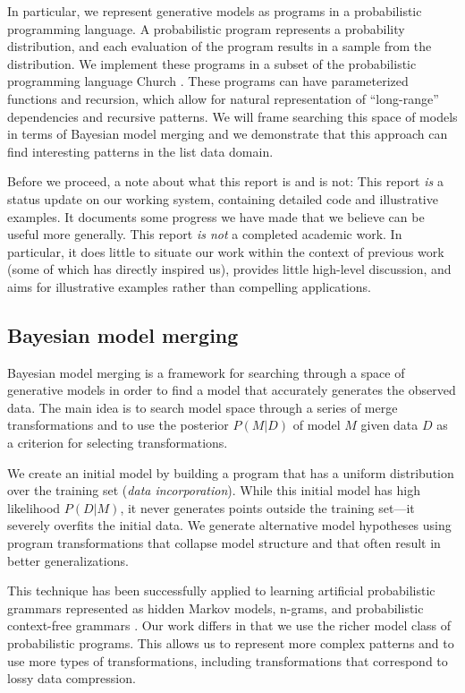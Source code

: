 \documentclass[a4paper,10pt]{article}
\begin{document}
In particular, we represent generative models as programs in a probabilistic programming language. A probabilistic program represents a probability distribution, and each evaluation of the program results in a sample from the distribution. We implement these programs in a subset of the probabilistic programming language Church \cite{N.D.Goodman:2008:f2a0d}.  
These programs can have parameterized functions and recursion, which allow for natural representation of ``long-range'' dependencies and recursive patterns.  We will frame searching this space of models in terms of Bayesian model merging \cite{Stolcke:1994:IPG:645515.658235} and we demonstrate that this approach can find interesting patterns in the list data domain.

Before we proceed, a note about what this report is and is not: This report \emph{is} a status update on our working system, containing detailed code and illustrative examples. It documents some progress we have made that we believe can be useful more generally.
This report \emph{is not} a completed academic work. In particular, it does little to situate our work within the context of previous work (some of which has  directly inspired us), provides little high-level discussion, and aims for illustrative examples rather than compelling applications.

\subsection{Bayesian model merging}

Bayesian model merging is a framework for searching through a space of generative models in order to find a model that accurately generates the observed data.  The main idea is to search model space through a series of merge transformations and to use the posterior $P(M|D)$ of model $M$ given data $D$ as a criterion for selecting transformations.

We create an initial model by building a program that has a uniform distribution over the training set ({\em data incorporation}).  While this initial model has high likelihood $P(D|M)$, it never generates points outside the training set---it severely overfits the initial data.  We generate alternative model hypotheses using program transformations that collapse model structure and that often result in better generalizations.

This technique has been successfully applied to learning artificial probabilistic grammars represented as hidden Markov models, n-grams, and probabilistic context-free grammars \cite{Stolcke:1994:IPG:645515.658235}. Our work differs in that we use the richer model class of probabilistic programs.  This allows us to represent more complex patterns and to use more types of transformations, including transformations that correspond to lossy data compression.
\end{document}
